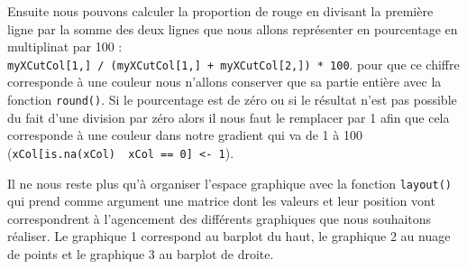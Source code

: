 \documentclass[]{book}
\theoremstyle{definition}
\theoremstyle{definition}
\theoremstyle{definition}
\theoremstyle{remark}
\begin{document}
Ensuite nous pouvons calculer la proportion de rouge en divisant la
première ligne par la somme des deux lignes que nous allons représenter
en pourcentage en multiplinat par 100 :
\texttt{myXCutCol{[}1,{]}\ /\ (myXCutCol{[}1,{]}\ +\ myXCutCol{[}2,{]})\ *\ 100}.
pour que ce chiffre corresponde à une couleur nous n'allons conserver
que sa partie entière avec la fonction \texttt{round()}. Si le
pourcentage est de zéro ou si le résultat n'est pas possible du fait
d'une division par zéro alors il nous faut le remplacer par 1 afin que
cela corresponde à une couleur dans notre gradient qui va de 1 à 100
(\texttt{xCol{[}is.na(xCol)\ \textbar{}\ xCol\ ==\ 0{]}\ \textless{}-\ 1}).

Il ne nous reste plus qu'à organiser l'espace graphique avec la fonction
\texttt{layout()} qui prend comme argument une matrice dont les valeurs
et leur position vont correspondrent à l'agencement des différents
graphiques que nous souhaitons réaliser. Le graphique 1 correspond au
barplot du haut, le graphique 2 au nuage de points et le graphique 3 au
barplot de droite.
\end{document}
